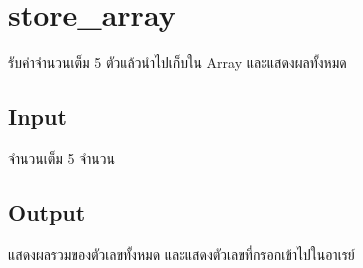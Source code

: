 \documentclass{article}
\begin{document}
\section*{store_array}

รับค่าจำนวนเต็ม 5 ตัวแล้วนำไปเก็บใน Array และแสดงผลทั้งหมด\\



\subsection*{Input}
จำนวนเต็ม 5 จำนวน



\subsection*{Output}
แสดงผลรวมของตัวเลขทั้งหมด และ{แสดงตัวเลขที่กรอกเข้าไปในอาเรย์}
\end{document}

